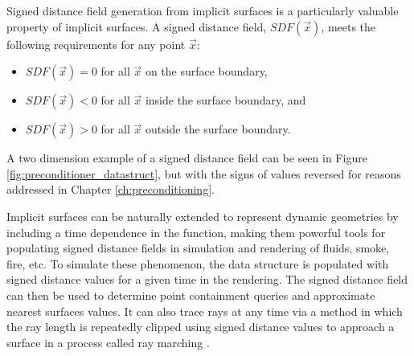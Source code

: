 

Signed distance field generation from implicit surfaces is a
particularly valuable property of implicit surfaces. A signed distance
field, $SDF(\vec{x})$, meets the following requirements
for any point $\vec{x}$:

\begin{itemize}
\item $ SDF(\vec{x}) = 0 $ for all $ \vec{x} $ on the surface boundary,
\item $ SDF(\vec{x}) < 0 $ for all $\vec{x}$ inside the surface boundary, and
\item $ SDF(\vec{x}) > 0 $ for all $\vec{x}$ outside the surface boundary.
\end{itemize}

A two dimension example of a signed distance field can be seen in Figure
\ref{fig:preconditioner_datastruct}, but with the signs of values reversed for
reasons addressed in Chapter \ref{ch:preconditioning}.

Implicit surfaces can be naturally extended to represent dynamic geometries by
including a time dependence in the function, making them powerful tools for
populating signed distance fields in simulation and rendering of fluids, smoke,
fire, etc. To simulate these phenomenon, the data structure is populated with
signed distance values for a given time in the rendering. The signed distance
field can then be used to determine point containment queries and approximate
nearest surfaces values. It can also trace rays at any time via a method in
which the ray length is repeatedly clipped using signed distance values to
approach a surface in a process called ray marching \cite{Tomczak_2012}.
